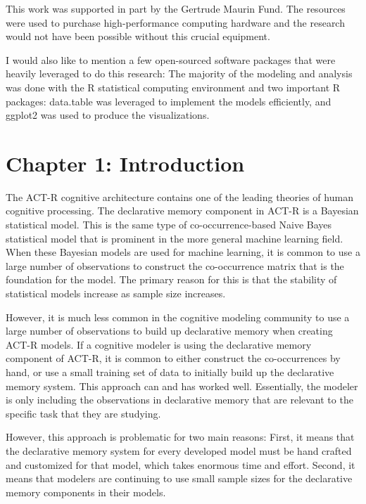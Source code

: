 \documentclass[man,floatsintext,donotrepeattitle]{apa6}
\begin{document}
This work was supported in part by the Gertrude Maurin Fund.
The resources were used to purchase high-performance computing hardware and the research would not have been possible without this crucial equipment.

I would also like to mention a few open-sourced software packages that were heavily leveraged to do this research:
The majority of the modeling and analysis was done with the R statistical computing environment \parencite{RCoreTeam2014} and two important R packages:
data.table \parencite{Dowle2014} was leveraged to implement the models efficiently, and ggplot2 \parencite{Wickham2009} was used to produce the visualizations.

\newpage

\tableofcontents
\newpage

\listoftables
\newpage

\listoffigures
\newpage

\section{Chapter 1: Introduction}

The ACT-R cognitive architecture \parencite{Anderson2007} contains one of the leading theories of human cognitive processing.
The declarative memory component in ACT-R is a Bayesian statistical model.
This is the same type of co-occurrence-based Naive Bayes statistical model that is prominent in the more general machine learning field.
When these Bayesian models are used for machine learning, it is common to use a large number of observations to construct the co-occurrence matrix that is the foundation for the model.
The primary reason for this is that the stability of statistical models increase as sample size increases.

However, it is much less common in the cognitive modeling community to use a large number of observations to build up declarative memory when creating ACT-R models.
If a cognitive modeler is using the declarative memory component of ACT-R,
it is common to either construct the co-occurrences by hand, or use a small training set of data to initially build up the declarative memory system.
This approach can and has worked well.
Essentially, the modeler is only including the observations in declarative memory that are relevant to the specific task that they are studying.

However, this approach is problematic for two main reasons:
First, it means that the declarative memory system for every developed model must be hand crafted and customized for that model, which takes enormous time and effort.
Second, it means that modelers are continuing to use small sample sizes for the declarative memory components in their models.
\end{document}
